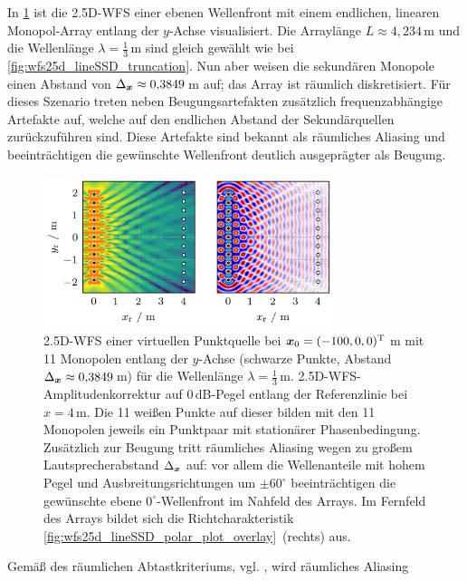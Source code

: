 In \Abb\ref{fig:wfs25d_lineSSD_aliasing} ist die 2.5D-WFS einer ebenen Wellenfront
mit einem endlichen, linearen Monopol-Array entlang der $y$-Achse visualisiert.
%
Die Arraylänge $L \approx 4{,}234$\,m und die Wellenlänge $\lambda=\frac{1}{3}$\,m sind
gleich gewählt wie bei \Abb\ref{fig:wfs25d_lineSSD_truncation}.
%
Nun aber weisen die sekundären Monopole einen Abstand von
$\Delta_{\bm{x}}\approx 0{,}3849$\,m auf; das Array ist räumlich diskretisiert.
%
Für dieses Szenario treten neben Beugungsartefakten zusätzlich
frequenzabhängige Artefakte auf, welche auf den endlichen Abstand der
Sekundärquellen zurückzuführen sind.
%
Diese Artefakte sind bekannt als räumliches Aliasing und beeinträchtigen die
gewünschte Wellenfront deutlich ausgeprägter als Beugung.
%
\begin{figure}[t]
\centering
\begin{plotfigures}
\includegraphics[width=85mm]{../python/wfs25d_lineSSD_aliasing.png}
\end{plotfigures}
\caption{2.5D-WFS einer virtuellen Punktquelle bei
$\bm{x}_\mathrm{0} = (-100,0,0)^\mathrm{T}$\,m mit 11 Monopolen entlang der $y$-Achse
(schwarze Punkte, Abstand $\Delta_{\bm{x}}\approx 0{,}3849$\,m)
für die Wellenlänge $\lambda=\frac{1}{3}$\,m.
%
2.5D-WFS-Amplitudenkorrektur auf $0$\,dB-Pegel entlang der Referenzlinie bei
$x=4$\,m.
%
Die 11 weißen Punkte auf dieser bilden mit den 11 Monopolen jeweils ein
Punktpaar mit stationärer Phasenbedingung.
%
Zusätzlich zur Beugung tritt räumliches Aliasing wegen zu großem Lautsprecherabstand
$\Delta_{\bm{x}} $ auf:
vor allem die Wellenanteile mit hohem Pegel und
Ausbreitungsrichtungen um $\pm 60^\circ$ beeinträchtigen die
gewünschte ebene $0^\circ$-Wellenfront im Nahfeld des Arrays.
%
Im Fernfeld des Arrays bildet sich die Richtcharakteristik
\Abb\ref{fig:wfs25d_lineSSD_polar_plot_overlay}~(rechts) aus.
%
\cc
}
\label{fig:wfs25d_lineSSD_aliasing}
\end{figure}
%
Gemäß des räumlichen Abtastkriteriums,
vgl. \cite[Kap.~26.4]{Skudrzyk1971}, wird räumliches Aliasing
